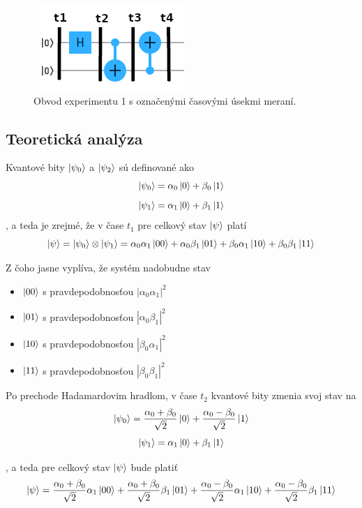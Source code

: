 \begin{figure} 
	\centering 
	\includegraphics[width=.6\textwidth]{figures/expr1_circuit.png} 
	\caption{Obvod experimentu 1 s označenými časovými úsekmi meraní.}
    \label{expr1_circuit}
\end{figure}

\subsection*{Teoretická analýza}
Kvantové bity \(\ket{\psi_0}\) a \(\ket{\psi_2}\) sú definované ako 
\[\ket{\psi_0} = \alpha_0\ket{0} + \beta_0\ket{1}\]
\[\ket{\psi_1} = \alpha_1\ket{0} + \beta_1\ket{1}\]
, a teda je zrejmé, že v čase \(t_1\) pre celkový stav \(\ket{\psi}\) platí 
\[\ket{\psi} = \ket{\psi_0} \otimes \ket{\psi_1} = \alpha_0\alpha_1\ket{00} + \alpha_0\beta_1\ket{01} + \beta_0\alpha_1\ket{10} + \beta_0\beta_1\ket{11}\]

Z čoho jasne vyplíva, že systém nadobudne stav
    \begin{itemize}
        \item[] \(\ket{00}\) s pravdepodobnosťou \(|\alpha_0\alpha_1 |^2\)
        \item[] \(\ket{01}\) s pravdepodobnosťou \(| \alpha_0\beta_1 |^2\)
        \item[] \(\ket{10}\) s pravdepodobnosťou \(| \beta_0\alpha_1 |^2\)
        \item[] \(\ket{11}\) s pravdepodobnosťou \(| \beta_0\beta_1 |^2\) 
    \end{itemize}

Po prechode Hadamardovim hradlom, v čase \(t_2\) kvantové bity zmenia svoj stav
 na
\[\ket{\psi_0} = \frac{\alpha_0 + \beta_0}{\sqrt{2}}\ket{0} + \frac{\alpha_0 - \beta_0}{\sqrt{2}}\ket{1}\]
\[\ket{\psi_1} = \alpha_1\ket{0} + \beta_1\ket{1}\]

, a teda pre celkový stav \(\ket{\psi}\) bude platiť
\[\ket{\psi} = \frac{\alpha_0 + \beta_0}{\sqrt{2}}\alpha_1\ket{00} + \frac{\alpha_0 + \beta_0}{\sqrt{2}}\beta_1\ket{01} + \frac{\alpha_0 - \beta_0}{\sqrt{2}}\alpha_1\ket{10} + \frac{\alpha_0 - \beta_0}{\sqrt{2}}\beta_1\ket{11}\]

